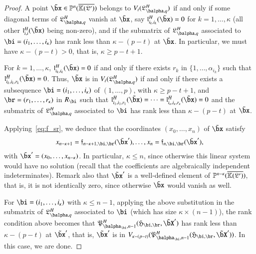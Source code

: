 \documentclass[amsthm]{elsart}
\begin{document}
\begin{proof}
  A point $\tilde\bx \in \P^n(\KKGpbar)$ belongs to
  $V_t(\mathfrak{L}^H_{\balpha,q})$ if and only if some diagonal terms
  of $\mathfrak{L}^H_{\balpha,q}$ vanish at $\tilde\bx$, say
  $\mathfrak{l}^H_{i_k,i_k}(\tilde\bx)=0$ for $k=1,\dots,\kappa$ (all
  other $\mathfrak{l}^H_{i,i}(\tilde\bx)$ being non-zero), and
  if the submatrix of $\mathfrak{L}^H_{\balpha,q}$ associated to
  $\bi=(i_1,\dots,i_\kappa)$ has rank less than $\kappa-(p-t)$ at $\tilde
  \bx$.  In particular, we must have
  $\kappa-(p-t) > 0$, that is, $\kappa \ge p-t+1$.

  For $k=1,\dots,\kappa$, $\mathfrak{l}^H_{i_k,i_k}(\tilde\bx)=0$ if
  and only if there exists $r_k$ in $\{1,\dots,\alpha_{i_k}\}$ such
  that $\mathfrak{l}^H_{i_k,i_k,r_k}(\tilde\bx)=0$. Thus, $\tilde\bx$
  is in $V_t(\mathfrak{L}^H_{\balpha,q})$ if and only if there exists
  a subsequence $\bi=(i_1,\dots,i_\kappa)$  of $(1,\dots,p)$, with
  $\kappa \ge p-t+1$, and $\br=(r_1,\dots,r_\kappa)$ in $R_\bi$ such that
  $\mathfrak{l}^H_{i_1,i_1,r_1}(\tilde\bx)=\cdots=\mathfrak{l}^H_{i_\kappa,i_\kappa,r_\kappa}(\tilde\bx)=0$
  and the submatrix of $\mathfrak{L}^H_{\balpha,q}$ associated to $\bi$
  has rank less than $\kappa-(p-t)$ at $\tilde\bx$.  

  Applying~\eqref{eq:f_sr}, we deduce that the coordinates $(x_0,\dots,x_n)$ 
  of $\tilde \bx$ satisfy
  \begin{align*}
    x_{n-\kappa+1}=\mathfrak{f}_{n-\kappa+1,\bi,\br}(\tilde\bx'),\dots,x_{n}=\mathfrak{f}_{n,\bi,\br}(\tilde\bx'),
  \end{align*}
  with $\tilde\bx'=(x_0,\dots,x_{n-\kappa})$.  In particular, $\kappa
  \le n$, since otherwise this linear system would have no solution
  (recall that the coefficients are algebraically independent
  indeterminates). Remark also that $\tilde\bx'$ is a well-defined
  element of $\mathbb{P}^{n-\kappa}(\overline{\mathbb{K}(\mathfrak{L}')})$, that is, it is not identically
  zero, since otherwise $\tilde\bx$ would vanish as well.

  For $\bi=(i_1,\dots,i_\kappa)$ with $\kappa \le n-1$, applying the above
  substitution in the submatrix of $\mathfrak{L}^H_{\balpha,q}$
  associated to $\bi$ (which has size $\kappa \times (n-1)$), the rank
  condition above becomes that
  $\mathfrak{P}^H_{\balpha_\bi,n-1}(\mathfrak{H}_{\bi,\br},\tilde\bX')$
  has rank less than $\kappa-(p-t)$ at $\tilde \bx'$, that is, $\tilde
  \bx'$ is in
  $V_{\kappa-(p-t)}(\mathfrak{P}^H_{\balpha_\bi,n-1}(\mathfrak{H}_{\bi,\br},\tilde\bX'))$.
  In this case, we are done.


\end{proof}
\end{document}
